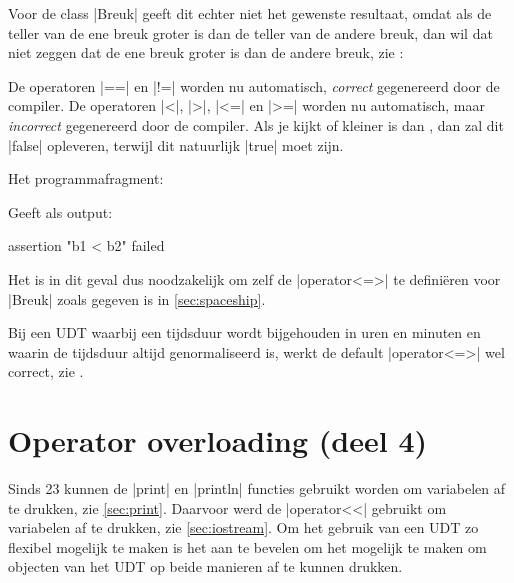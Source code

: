 \begin{cpplstShortInline}
Voor de class |Breuk| geeft dit echter niet het gewenste resultaat, omdat als de teller van de ene breuk groter is dan de teller van de andere breuk, dan wil dat niet zeggen dat de ene breuk groter is dan de andere breuk, zie :

De operatoren |==| en |!=| worden nu automatisch, \emph{correct} gegenereerd door de compiler.
De operatoren |<|, |>|, |<=| en |>=| worden nu automatisch, maar \emph{incorrect} gegenereerd door de compiler.
Als je kijkt of  kleiner is dan , dan zal dit |false| opleveren, terwijl dit natuurlijk |true| moet zijn.

Het programmafragment:

Geeft als output:
\begin{coutput}
assertion "b1 < b2" failed
\end{coutput}

Het is in dit geval dus noodzakelijk om zelf de |operator<=>| te definiëren voor |Breuk| zoals gegeven is in \cref{sec:spaceship}.

Bij een UDT waarbij een tijdsduur wordt bijgehouden in uren en minuten en waarin de tijdsduur altijd genormaliseerd is, werkt de default |operator<=>| wel correct, zie .

\section{Operator overloading (deel 4)} 
\label{sec:overloadoutput}
Sinds \Cpp{}23 kunnen de |print| en |println| functies gebruikt worden om variabelen af te drukken, zie \cref{sec:print}.
Daarvoor werd de |operator<<| gebruikt om variabelen af te drukken, zie \cref{sec:iostream}.
Om het gebruik van een UDT zo flexibel mogelijk te maken is het aan te bevelen om het mogelijk te maken om objecten van het UDT op beide manieren af te kunnen drukken.


\end{cpplstShortInline}

